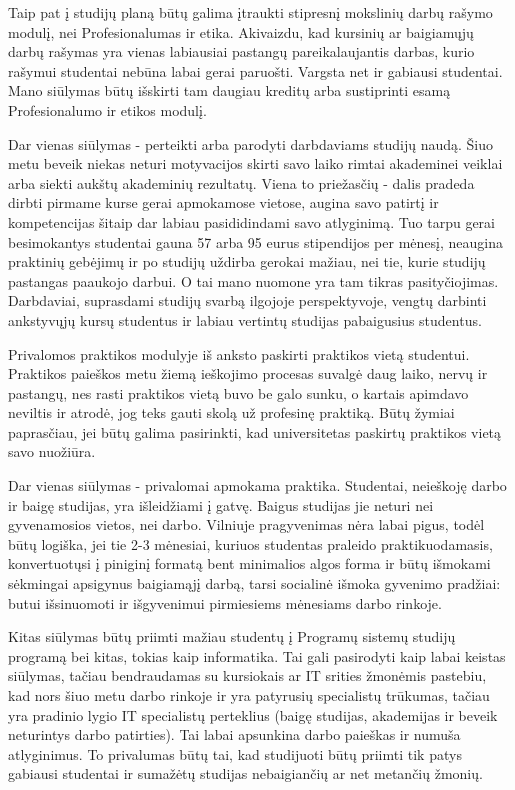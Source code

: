 \documentclass{VUMIFPSkursinis}
\begin{document}
Taip pat į studijų planą būtų galima įtraukti stipresnį mokslinių darbų rašymo modulį, nei Profesionalumas ir etika. Akivaizdu, kad kursinių ar baigiamųjų darbų rašymas yra vienas labiausiai pastangų pareikalaujantis darbas, kurio rašymui studentai nebūna labai gerai paruošti. Vargsta net ir gabiausi studentai. Mano siūlymas būtų išskirti tam daugiau kreditų arba sustiprinti esamą Profesionalumo ir etikos modulį.

Dar vienas siūlymas - perteikti arba parodyti darbdaviams studijų naudą. Šiuo metu beveik niekas neturi motyvacijos skirti savo laiko rimtai akademinei veiklai arba siekti aukštų akademinių rezultatų. Viena to priežasčių - dalis pradeda dirbti pirmame kurse gerai apmokamose vietose, augina savo patirtį ir kompetencijas šitaip dar labiau pasididindami savo atlyginimą. Tuo tarpu gerai besimokantys studentai gauna 57 arba 95 eurus stipendijos per mėnesį, neaugina praktinių gebėjimų ir po studijų uždirba gerokai mažiau, nei tie, kurie studijų pastangas paaukojo darbui. O tai mano nuomone yra tam tikras pasityčiojimas. Darbdaviai, suprasdami studijų svarbą ilgojoje perspektyvoje, vengtų darbinti ankstyvųjų kursų studentus ir labiau vertintų studijas pabaigusius studentus.

Privalomos praktikos modulyje iš anksto paskirti praktikos vietą studentui. Praktikos paieškos metu žiemą ieškojimo procesas suvalgė daug laiko, nervų ir pastangų, nes rasti praktikos vietą buvo be galo sunku, o kartais apimdavo neviltis ir atrodė, jog teks gauti skolą už profesinę praktiką. Būtų žymiai paprasčiau, jei būtų galima pasirinkti, kad universitetas paskirtų praktikos vietą savo nuožiūra.

Dar vienas siūlymas - privalomai apmokama praktika. Studentai, neieškoję darbo ir baigę studijas, yra išleidžiami į gatvę. Baigus studijas jie neturi nei gyvenamosios vietos, nei darbo. Vilniuje pragyvenimas nėra labai pigus, todėl būtų logiška, jei tie 2-3 mėnesiai, kuriuos studentas praleido praktikuodamasis, konvertuotųsi į piniginį formatą bent minimalios algos forma ir būtų išmokami sėkmingai apsigynus baigiamąjį darbą, tarsi socialinė išmoka gyvenimo pradžiai: butui išsinuomoti ir išgyvenimui pirmiesiems mėnesiams darbo rinkoje.

Kitas siūlymas būtų priimti mažiau studentų į Programų sistemų studijų programą bei kitas, tokias kaip informatika. Tai gali pasirodyti kaip labai keistas siūlymas, tačiau bendraudamas su kursiokais ar IT srities žmonėmis pastebiu, kad nors šiuo metu darbo rinkoje ir yra patyrusių specialistų trūkumas, tačiau yra pradinio lygio IT specialistų perteklius (baigę studijas, akademijas ir beveik neturintys darbo patirties). Tai labai apsunkina darbo paieškas ir numuša atlyginimus. To privalumas būtų tai, kad studijuoti būtų priimti tik patys gabiausi studentai ir sumažėtų studijas nebaigiančių ar net metančių žmonių.


\end{document}
